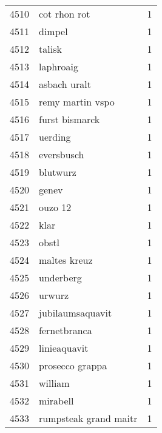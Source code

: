 \begin{tabular}{llr}
4510 &                                       cot rhon rot &      1 \\
4511 &                                             dimpel &      1 \\
4512 &                                             talisk &      1 \\
4513 &                                          laphroaig &      1 \\
4514 &                                       asbach uralt &      1 \\
4515 &                                   remy martin vspo &      1 \\
4516 &                                     furst bismarck &      1 \\
4517 &                                            uerding &      1 \\
4518 &                                         eversbusch &      1 \\
4519 &                                           blutwurz &      1 \\
4520 &                                              genev &      1 \\
4521 &                                            ouzo 12 &      1 \\
4522 &                                               klar &      1 \\
4523 &                                              obstl &      1 \\
4524 &                                       maltes kreuz &      1 \\
4525 &                                          underberg &      1 \\
4526 &                                             urwurz &      1 \\
4527 &                                   jubilaumsaquavit &      1 \\
4528 &                                       fernetbranca &      1 \\
4529 &                                       linieaquavit &      1 \\
4530 &                                    prosecco grappa &      1 \\
4531 &                                            william &      1 \\
4532 &                                           mirabell &      1 \\
4533 &                              rumpsteak grand maitr &      1 \\

\end{tabular}
